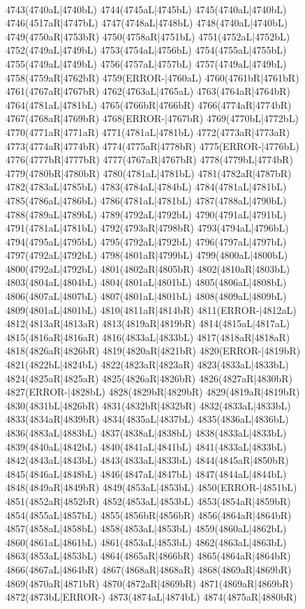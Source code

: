 \\4743(4740aL|4740bL) 4744(4745aL|4745bL) 4745(4740aL|4740bL) 4746(4517aR|4747bL) 4747(4748aL|4748bL) 4748(4740aL|4740bL) 4749(4750aR|4753bR) 4750(4758aR|4751bL) 4751(4752aL|4752bL) \\4752(4749aL|4749bL) 4753(4754aL|4756bL) 4754(4755aL|4755bL) 4755(4749aL|4749bL) 4756(4757aL|4757bL) 4757(4749aL|4749bL) 4758(4759aR|4762bR) 4759(ERROR-|4760aL) 4760(4761bR|4761bR) \\4761(4767aR|4767bR) 4762(4763aL|4765aL) 4763(4764aR|4764bR) 4764(4781aL|4781bL) 4765(4766bR|4766bR) 4766(4774aR|4774bR) 4767(4768aR|4769bR) 4768(ERROR-|4767bR) 4769(4770bL|4772bL) \\4770(4771aR|4771aR) 4771(4781aL|4781bL) 4772(4773aR|4773aR) 4773(4774aR|4774bR) 4774(4775aR|4778bR) 4775(ERROR-|4776bL) 4776(4777bR|4777bR) 4777(4767aR|4767bR) 4778(4779bL|4774bR) \\4779(4780bR|4780bR) 4780(4781aL|4781bL) 4781(4782aR|4787bR) 4782(4783aL|4785bL) 4783(4784aL|4784bL) 4784(4781aL|4781bL) 4785(4786aL|4786bL) 4786(4781aL|4781bL) 4787(4788aL|4790bL) \\4788(4789aL|4789bL) 4789(4792aL|4792bL) 4790(4791aL|4791bL) 4791(4781aL|4781bL) 4792(4793aR|4798bR) 4793(4794aL|4796bL) 4794(4795aL|4795bL) 4795(4792aL|4792bL) 4796(4797aL|4797bL) \\4797(4792aL|4792bL) 4798(4801aR|4799bL) 4799(4800aL|4800bL) 4800(4792aL|4792bL) 4801(4802aR|4805bR) 4802(4810aR|4803bL) 4803(4804aL|4804bL) 4804(4801aL|4801bL) 4805(4806aL|4808bL) \\4806(4807aL|4807bL) 4807(4801aL|4801bL) 4808(4809aL|4809bL) 4809(4801aL|4801bL) 4810(4811aR|4814bR) 4811(ERROR-|4812aL) 4812(4813aR|4813aR) 4813(4819aR|4819bR) 4814(4815aL|4817aL) \\4815(4816aR|4816aR) 4816(4833aL|4833bL) 4817(4818aR|4818aR) 4818(4826aR|4826bR) 4819(4820aR|4821bR) 4820(ERROR-|4819bR) 4821(4822bL|4824bL) 4822(4823aR|4823aR) 4823(4833aL|4833bL) \\4824(4825aR|4825aR) 4825(4826aR|4826bR) 4826(4827aR|4830bR) 4827(ERROR-|4828bL) 4828(4829bR|4829bR) 4829(4819aR|4819bR) 4830(4831bL|4826bR) 4831(4832bR|4832bR) 4832(4833aL|4833bL) \\4833(4834aR|4839bR) 4834(4835aL|4837bL) 4835(4836aL|4836bL) 4836(4883aL|4883bL) 4837(4838aL|4838bL) 4838(4833aL|4833bL) 4839(4840aL|4842bL) 4840(4841aL|4841bL) 4841(4833aL|4833bL) \\4842(4843aL|4843bL) 4843(4833aL|4833bL) 4844(4845aR|4850bR) 4845(4846aL|4848bL) 4846(4847aL|4847bL) 4847(4844aL|4844bL) 4848(4849aR|4849bR) 4849(4853aL|4853bL) 4850(ERROR-|4851bL) \\4851(4852aR|4852bR) 4852(4853aL|4853bL) 4853(4854aR|4859bR) 4854(4855aL|4857bL) 4855(4856bR|4856bR) 4856(4864aR|4864bR) 4857(4858aL|4858bL) 4858(4853aL|4853bL) 4859(4860aL|4862bL) \\4860(4861aL|4861bL) 4861(4853aL|4853bL) 4862(4863aL|4863bL) 4863(4853aL|4853bL) 4864(4865aR|4866bR) 4865(4864aR|4864bR) 4866(4867aL|4864bR) 4867(4868aR|4868aR) 4868(4869aR|4869bR) \\4869(4870aR|4871bR) 4870(4872aR|4869bR) 4871(4869aR|4869bR) 4872(4873bL|ERROR-) 4873(4874aL|4874bL) 4874(4875aR|4880bR) 